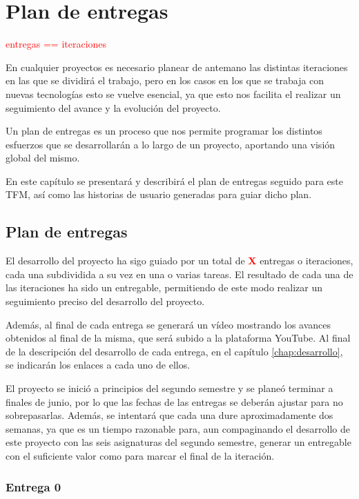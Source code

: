 \chapter{Plan de entregas}
\label{chap:plan_entregas}

\textcolor{red}{entregas == iteraciones}

En cualquier proyectos es necesario planear de antemano las distintas iteraciones en las que se dividirá el trabajo, pero en los casos en los que se trabaja con nuevas tecnologías esto se vuelve esencial, ya que esto nos facilita el realizar un seguimiento del avance y la evolución del proyecto.

Un plan de entregas es un proceso que nos permite programar los distintos esfuerzos que se desarrollarán a lo largo de un proyecto, aportando  una visión global del mismo.

En este capítulo se presentará y describirá el plan de entregas seguido para este \acs{TFM}, así como las historias de usuario generadas para guiar dicho plan.

\section{Plan de entregas}

El desarrollo del proyecto ha sigo guiado por un total de \textbf{\textcolor{red}{X}} entregas o iteraciones, cada una subdividida a su vez en una o varias tareas. El resultado de cada una de las iteraciones ha sido un entregable, permitiendo de este modo realizar un seguimiento preciso del desarrollo del proyecto.

Además, al final de cada entrega se generará un vídeo mostrando los avances obtenidos al final de la misma, que será subido a la plataforma YouTube. Al final de la descripción del desarrollo de cada entrega, en el capítulo \ref{chap:desarrollo}, se indicarán los enlaces  a cada uno de ellos.

El proyecto se inició a principios del segundo semestre y se planeó terminar a finales de junio, por lo que las fechas de las entregas se deberán ajustar para no sobrepasarlas. Además, se intentará que cada una dure aproximadamente dos semanas, ya que es un tiempo razonable para, aun compaginando el desarrollo de este proyecto con las seis asignaturas del segundo semestre, generar un entregable con el suficiente valor como para marcar el final de la iteración.

\subsection{Entrega 0}

